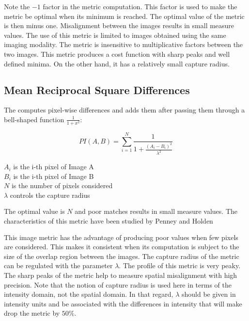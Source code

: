 Note the $-1$ factor in the metric computation. This factor is used to make the
metric be optimal when its minimum is reached.  The optimal value of the metric
is then minus one. Misalignment between the images results in small measure
values.  The use of this metric is limited to images obtained using the same
imaging modality.  The metric is insensitive to multiplicative factors between
the two images.  This metric produces a cost function with sharp peaks and well
defined minima.  On the other hand, it has a relatively small capture radius.

\subsection{Mean Reciprocal Square Differences}
\label{sec:MeanReciprocalSquareDifferenceMetric}

The  computes
pixel-wise differences and adds them after passing them through a bell-shaped
function $\frac{1}{1+x^2}$:

\begin{equation}
PI(A,B) =  \sum_{i=1}^N \frac{ 1 }{ 1 + \frac{ \left( A_i - B_i \right) ^ 2}{ \lambda^2 }  }
\end{equation}
\begin{center}
$A_i$ is the i-th pixel of Image A \\
$B_i$ is the i-th pixel of Image B \\
$N$ is the number of pixels considered \\
$\lambda$ controls the capture radius
\end{center}

The optimal value is $N$ and poor matches results in small measure values.
The characteristics of this metric have been studied by Penney and Holden
\cite{Holden1999}\cite{Penney1998}

This image metric has the advantage of producing poor values when few pixels
are considered.  This makes it consistent when its computation is subject to
the size of the overlap region between the images. The capture radius of the
metric can be regulated with the parameter $\lambda$.  The profile of this
metric is very peaky. The sharp peaks of the metric help to measure spatial
misalignment with high precision. Note that the notion of capture radius is
used here in terms of the intensity domain, not the spatial domain. In that
regard, $\lambda$ should be given in intensity units and be associated with
the differences in intensity that will make drop the metric by $50\%$.

